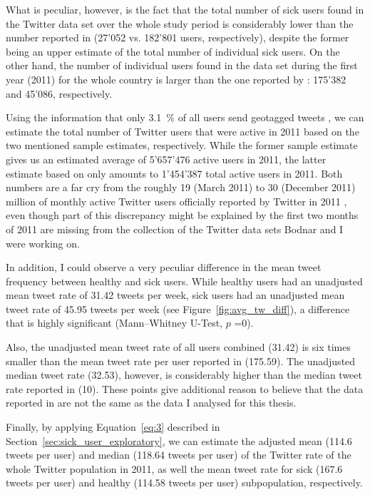 \documentclass[11pt, a4paper,twoside]{report}\usepackage[]{graphicx}\usepackage[]{color}
\begin{document}
What is peculiar, however, is the fact that the total number of sick users found in the Twitter data set over the whole study period is considerably lower than the number reported in \cite{bodnar_data_2015} (27'052 vs. 182'801 users, respectively), despite the former being an upper estimate of the total number of individual sick users. On the other hand, the number of individual users found in the data set during the first year (2011) for the whole country is larger than the one reported by \cite{bodnar_data_2015}: 175'382 and 45'086, respectively.

Using the information that only 3.1~\% of all users send geotagged tweets \citep{sloan2013knowing}, we can estimate the total number of Twitter users that were active in 2011 based on the two mentioned sample estimates, respectively. While the former sample estimate gives us an estimated average of 5'657'476 active users in 2011, the latter estimate based on \cite{bodnar_data_2015} only amounts to 1'454'387 total active users in 2011. Both numbers are a far cry from the roughly 19 (March 2011) to 30 (December 2011) million of monthly active Twitter users officially reported by Twitter in 2011 \citep{twitter_annual_2013}, even though part of this discrepancy might be explained by the first two months of 2011 are missing from the collection of the Twitter data sets Bodnar and I were working on.

In addition, I could observe a very peculiar difference in the mean tweet frequency between healthy and sick users. While healthy users had an unadjusted mean tweet rate of 31.42 tweets per week, sick users had an unadjusted mean tweet rate of 45.95 tweets per week (see Figure~\ref{fig:avg_tw_diff}), a difference that is highly significant (Mann--Whitney U-Test, $p$ =0).

Also, the unadjusted mean tweet rate of all users combined (31.42) is six times smaller than the mean tweet rate per user reported in \cite{bodnar_data_2015} (175.59). The unadjusted median tweet rate (32.53), however, is considerably higher than the median tweet rate reported in \cite{bodnar_data_2015} (10). These points give additional reason to believe that the data reported in \cite{bodnar_data_2015} are not the same as the data I analysed for this thesis.

Finally, by applying Equation~\ref{eq:3} described in Section~\ref{sec:sick_user_exploratory}, we can estimate the adjusted mean (114.6 tweets per user) and median (118.64 tweets per user) of the Twitter rate of the whole Twitter population in 2011, as well the mean tweet rate for sick (167.6 tweets per user) and healthy (114.58 tweets per user) subpopulation, respectively.\newpage
\end{document}
